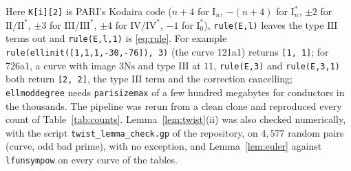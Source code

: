 \documentclass[11pt]{amsart}
\theoremstyle{definition}
\newcommand{\Ns}{3\mathrm{Ns}}
\begin{document}
Here \texttt{K[i][2]} is PARI's Kodaira code ($n+4$ for $\mathrm{I}_n$, $-(n+4)$ for $\mathrm{I}_n^*$, $\pm2$ for $\mathrm{II}/\mathrm{II}^*$, $\pm3$ for $\mathrm{III}/\mathrm{III}^*$, $\pm4$ for $\mathrm{IV}/\mathrm{IV}^*$, $-1$ for $\mathrm{I}_0^*$), \texttt{rule(E,l)} leaves the type $\mathrm{III}$ terms out and \texttt{rule(E,l,1)} is \eqref{eq:rule}. For example \texttt{rule(ellinit([1,1,1,-30,-76]), 3)} (the curve 121a1) returns \texttt{[1, 1]}; for 726a1, a curve with image $\Ns$ and type $\mathrm{III}$ at $11$, \texttt{rule(E,3)} and \texttt{rule(E,3,1)} both return \texttt{[2, 2]}, the type $\mathrm{III}$ term and the correction cancelling; \texttt{ellmoddegree} needs \texttt{parisizemax} of a few hundred megabytes for conductors in the thousands. The pipeline was rerun from a clean clone and reproduced every count of Table~\ref{tab:counts}. Lemma~\ref{lem:twist}(ii) was also checked numerically, with the script \texttt{twist\_lemma\_check.gp} of the repository, on $4{,}577$ random pairs (curve, odd bad prime), with no exception, and Lemma~\ref{lem:euler} against \texttt{lfunsympow} on every curve of the tables.
\end{document}
